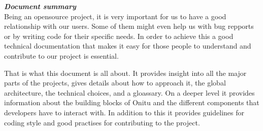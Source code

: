 \thispagestyle{empty}
\vspace*{10mm}

\textbf{\emph{\textcolor{onitu}{\large{Document summary} } } }\\

Being an opensource project, it is very important for us to have a good relationship with our users. Some of them might even help us with bug repports or by writing code for their specific needs. In order to achieve this a good technical documentation that makes it easy for those people to understand and contribute to our project is essential.

That is what this document is all about. It provides insight into all the major parts of the projects, gives details about how to approach it, the global architecture, the technical choices, and a gloassary. On a deeper level it provides information about the building blocks of Onitu and the different components that developers have to interact with. In addition to this it provides guidelines for coding style and good practises for contributing to the project.

\clearpage
